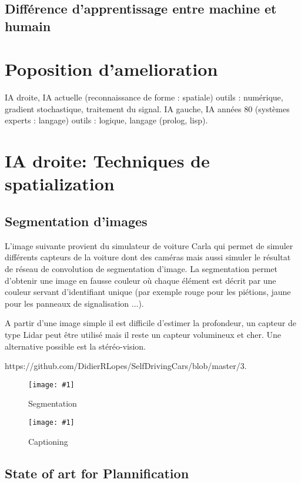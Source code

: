 \documentclass[french, a4paper, 10pt]{article}
\newcommand{\dessin}[4]{
\begin{figure}[htb]
\centering
\texttt{[image: \#1]}
\caption{#3}
\label{#4}
\end{figure}}
\begin{document}
\subsection{Différence d'apprentissage entre machine et humain}

\section{Poposition d'amelioration}

IA droite, IA actuelle (reconnaissance de forme : spatiale) outils : numérique,
gradient stochastique, traitement du signal.  IA gauche, IA années 80 (systèmes
experts : langage) outils : logique, langage (prolog, lisp).

\section{IA droite: Techniques de spatialization}

\subsection{Segmentation d'images}

L'image suivante provient du simulateur de voiture Carla qui permet de simuler différents
capteurs de la voiture dont des caméras mais aussi simuler le résultat de réseau de convolution
de segmentation d'image. La segmentation permet d'obtenir une image en fausse couleur où chaque
élément est décrit par une couleur servant d'identifiant unique (par exemple rouge pour les piétions,
jaune pour les panneaux de signalisation ...).

A partir d'une image simple il est difficile d'estimer la profondeur, un capteur de type Lidar peut être
utilisé mais il reste un capteur volumineux et cher. Une alternative possible est la stéréo-vision.

https://github.com/DidierRLopes/SelfDrivingCars/blob/master/3.%

\dessin{pics/segmentation}{0.40}{Segmentation}{segmentation}


\dessin{pics/captioning}{0.40}{Captioning}{captioning}

\subsection{State of art for Plannification}
\end{document}
